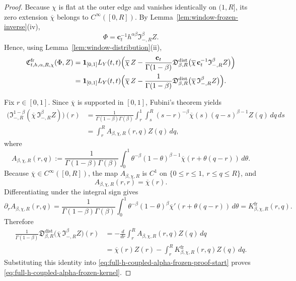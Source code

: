 \documentclass[11pt,a4paper]{amsart}
\theoremstyle{plain}
\theoremstyle{definition}
\theoremstyle{remark}
\newcommand{\one}{\mathbf 1}
\begin{document}
\begin{proof}
Because \(\chi\) is flat at the outer edge and vanishes identically on \((1,R]\), its zero
extension \(\overline\chi\) belongs to \(C^\infty([0,R])\). By
Lemma~\ref{lem:window-frozen-inverse}(iv),
\[
\Phi
=
\mathbf c_t^{-1}h^{\alpha\beta}\mathfrak I_{-,R}^{\beta}Z.
\]
Hence, using Lemma~\ref{lem:window-distribution}(ii),
\begin{align}
\mathfrak C_{t,h,\alpha,R,\chi}^{\mathrm{fr}}(\Phi,Z)
&=
\one_{[0,1]}L_Y(t,t)
\Bigl(
\overline\chi\,Z
-
\frac{\mathbf c_t}{\Gamma(1-\beta)}
\mathfrak D_{\beta,R}^{\mathrm{dist}}
\bigl(
\overline\chi\,\mathbf c_t^{-1}\mathfrak I_{-,R}^{\beta}Z
\bigr)
\Bigr)
\notag\\
&=
\one_{[0,1]}L_Y(t,t)
\Bigl(
\overline\chi\,Z
-
\frac{1}{\Gamma(1-\beta)}
\mathfrak D_{\beta,R}^{\mathrm{dist}}
\bigl(
\overline\chi\,\mathfrak I_{-,R}^{\beta}Z
\bigr)
\Bigr).
\label{eq:full-h-coupled-alpha-frozen-proof-start}
\end{align}

Fix \(r\in[0,1]\). Since \(\overline\chi\) is supported in \([0,1]\), Fubini's theorem yields
\begin{align*}
\bigl(
\mathfrak I_{-,R}^{1-\beta}
(\overline\chi\,\mathfrak I_{-,R}^{\beta}Z)
\bigr)(r)
&=
\frac{1}{\Gamma(1-\beta)\Gamma(\beta)}
\int_r^1 \int_s^R
(s-r)^{-\beta}\overline\chi(s)(q-s)^{\beta-1}Z(q)\,dq\,ds \\
&=
\int_r^R A_{\beta,\chi,R}(r,q)Z(q)\,dq,
\end{align*}
where
\[
A_{\beta,\chi,R}(r,q)
:=
\frac{1}{\Gamma(1-\beta)\Gamma(\beta)}
\int_0^1
\theta^{-\beta}(1-\theta)^{\beta-1}
\overline\chi(r+\theta(q-r))\,d\theta.
\]
Because \(\overline\chi\in C^\infty([0,R])\), the map \(A_{\beta,\chi,R}\) is \(C^1\) on
\(\{0\le r\le1,\ r\le q\le R\}\), and
\[
A_{\beta,\chi,R}(r,r)=\overline\chi(r).
\]
Differentiating under the integral sign gives
\[
\partial_r A_{\beta,\chi,R}(r,q)
=
\frac{1}{\Gamma(1-\beta)\Gamma(\beta)}
\int_0^1
\theta^{-\beta}(1-\theta)^\beta
\overline\chi'(r+\theta(q-r))\,d\theta
=
K_{\beta,\chi,R}^{\mathrm{fr}}(r,q).
\]
Therefore
\begin{align*}
\frac{1}{\Gamma(1-\beta)}
\mathfrak D_{\beta,R}^{\mathrm{dist}}
\bigl(
\overline\chi\,\mathfrak I_{-,R}^{\beta}Z
\bigr)(r)
&=
-\frac{d}{dr}
\int_r^R A_{\beta,\chi,R}(r,q)Z(q)\,dq \\
&=
\overline\chi(r)Z(r)-\int_r^R
K_{\beta,\chi,R}^{\mathrm{fr}}(r,q)Z(q)\,dq.
\end{align*}
Substituting this identity into \eqref{eq:full-h-coupled-alpha-frozen-proof-start} proves
\eqref{eq:full-h-coupled-alpha-frozen-kernel}.


\end{proof}
\end{document}
